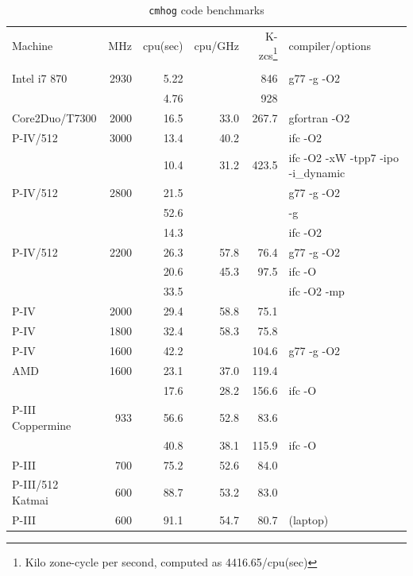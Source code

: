 \documentclass[10pt,dvips]{article}
\begin{document}
\begin{table}[htbp]
\centering
\medskip
\caption{{\tt cmhog} code benchmarks}
\begin{tabular}{|l|r|r|r|r|l|} \hline
Machine & MHz  	      
	& cpu(sec) 
	& cpu/GHz 
	& K-zcs\footnote{Kilo zone-cycle per second, computed as 4416.65/cpu(sec)}
	& compiler/options \\ 
&&&&&  \\ \hline
Intel i7 870    & 2930  &         5.22 &      & 846  & g77 -g -O2 \\ %
                &       &         4.76 &      & 928  & \\
Core2Duo/T7300  & 2000  &        16.5 & 33.0  & 267.7 & gfortran -O2 \\  %
P-IV/512        & 3000  &        13.4 & 40.2  &       & ifc -O2 \\  %
                &       &        10.4 & 31.2  & 423.5 & ifc -O2 -xW -tpp7 -ipo -i\_dynamic \\
P-IV/512	& 2800	&	 21.5 &       &       & g77 -g -O2 \\  %
                &       &        52.6 &       &       & -g \\
                &       &        14.3 &       &       & ifc -O2 \\    
P-IV/512	& 2200	&	 26.3 & 57.8  &  76.4 & g77 -g -O2 \\  %
                &       &        20.6 & 45.3  &  97.5 & ifc -O \\
		&       &        33.5 &       &       & ifc -O2 -mp \\
P-IV		& 2000  &	 29.4 & 58.8  &  75.1 &  \\  %
P-IV		& 1800  &	 32.4 & 58.3  &  75.8 &  \\  %
P-IV            & 1600  &        42.2 &       & 104.6 & g77 -g -O2 \\ %
AMD 		& 1600  &        23.1 & 37.0  & 119.4 & \\ %
                &       &        17.6 & 28.2  & 156.6 & ifc -O \\
P-III Coppermine & 933   &	 56.6 & 52.8  &  83.6 & \\ %
                 &       &       40.8 & 38.1  & 115.9 & ifc -O \\
P-III		& 700   &	 75.2 & 52.6  &  84.0 & \\ %
P-III/512 Katmai & 600	&	 88.7 & 53.2  &  83.0 &  \\ %
P-III		& 600	&	 91.1 & 54.7  &  80.7 & (laptop) \\ %

\end{tabular}
\end{table}
\end{document}
